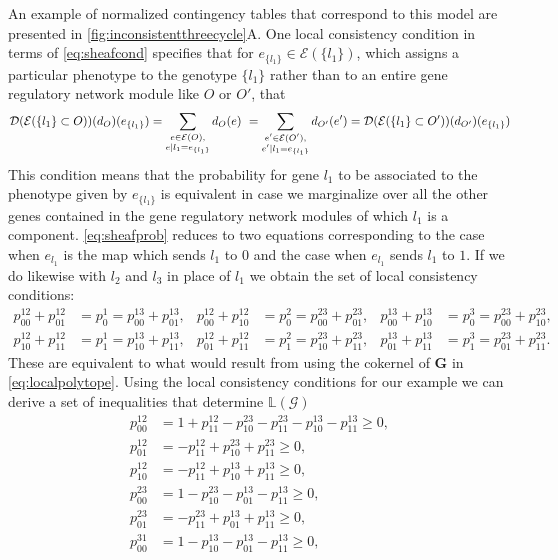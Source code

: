 An example of normalized contingency tables that correspond to this model are presented in \ref{fig:inconsistentthreecycle}A.
One local consistency condition in terms of \ref{eq:sheafcond} specifies that for $e_{\{l_1\}} \in \mathcal{E}(\{l_1\})$, which assigns a particular phenotype to the genotype $\{l_1\}$ rather than to an entire gene regulatory network module like $O$ or $O'$, that
\begin{eqnarray}\label{eq:sheafprob}
\mathcal{D} (\mathcal{E}( \{ l_1 \} \subset O ) )(d_O)(e_{\{l_1\}}) = \sum_{\substack{ e \in \mathcal{E}(O), \\  e|l_1=e_{\{l_1\}}} } d_O(e) \,\, = \sum_{\substack{ e' \in \mathcal{E}(O'), \\ e'|l_1=e_{\{l_1\}}} } d_{O'}(e') = \mathcal{D} (\mathcal{E}( \{ l_1 \} \subset O' ) )(d_{O'})(e_{\{l_1\}})
\end{eqnarray}
This condition means that the probability for gene $l_1$ to be associated to the phenotype given by $e_{\{l_1\}}$ is equivalent in case we marginalize over all the other genes contained in the gene regulatory network modules of which $l_1$ is a component.  \ref{eq:sheafprob} reduces to two equations corresponding to the case when $e_{l_1}$ is the map which sends $l_1$ to $0$ and the case when $e_{l_1}$ sends $l_1$ to $1$. If we do likewise with $l_2$ and $l_3$ in place of $l_1$ we obtain the set of local consistency conditions:
\begin{equation}
\begin{aligned}\label{eq:localconsistencythreegenes}
 p^{12}_{00} + p^{12}_{01} &= p^{1}_0 = p^{13}_{00} + p^{13}_{01}, &
 p^{12}_{00} + p^{12}_{10} &= p^{2}_0 = p^{23}_{00} + p^{23}_{01}, &
 p^{13}_{00} + p^{13}_{10} &= p^{3}_0 = p^{23}_{00} + p^{23}_{10},\\
 p^{12}_{10} + p^{12}_{11} &= p^{1}_1 = p^{13}_{10} + p^{13}_{11}, &
 p^{12}_{01} + p^{12}_{11} &= p^{2}_1 = p^{23}_{10} + p^{23}_{11}, &
 p^{13}_{01} + p^{13}_{11} &= p^{3}_1 = p^{23}_{01} + p^{23}_{11}.
 \end{aligned}
 \end{equation}
These are equivalent to what would result from using the cokernel of $\mathbf{G}$ in \ref{eq:localpolytope}.
Using the local consistency conditions for our example we can derive a set of inequalities that determine $\mathbb{L}(\mathcal{G})$
\begin{equation}
\begin{aligned}\label{eq:threecycinequalities}
p^{12}_{00} &= 1 + p^{12}_{11} - p^{23}_{10} - p^{23}_{11} - p^{13}_{10} - p^{13}_{11} \geq 0, \\
p^{12}_{01} &= -p^{12}_{11} + p^{23}_{10} + p^{23}_{11} \geq 0,\\
p^{12}_{10} &= -p^{12}_{11} + p^{13}_{10} + p^{13}_{11} \geq 0,\\
p^{23}_{00} &= 1-p^{23}_{10} - p^{13}_{01} - p^{13}_{11} \geq 0,\\
p^{23}_{01} &= -p^{23}_{11} + p^{13}_{01} + p^{13}_{11} \geq 0,\\
p^{31}_{00} &= 1-p^{13}_{10} - p^{13}_{01} - p^{13}_{11} \geq 0,
\end{aligned}
\end{equation}
